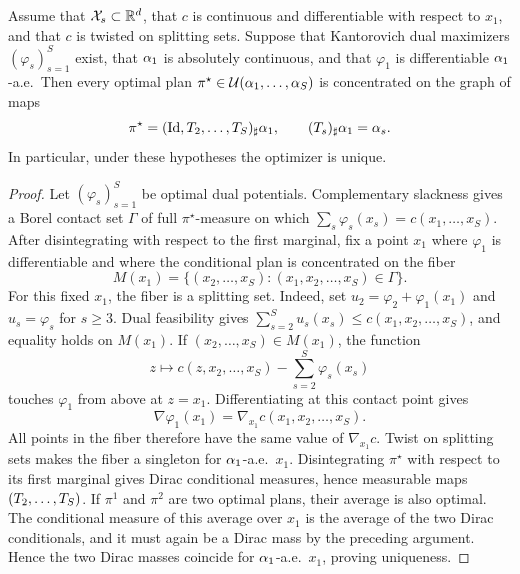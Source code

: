 \begin{prop}\label{prop-multimarginal-monge-structure}
	Assume that $\mathcal{X}_s\subset\mathbb{R}^d$, that $c$ is continuous and differentiable with respect to $x_1$, and that $c$ is twisted on splitting sets. Suppose that Kantorovich dual maximizers $(\varphi_s)_{s=1}^S$ exist, that $\alpha_1$ is absolutely continuous, and that $\varphi_1$ is differentiable $\alpha_1$-a.e.\ Then every optimal plan $\pi^\star\in\mathcal{U}(\alpha_1,\ldots,\alpha_S)$ is concentrated on the graph of maps
	\[
		\pi^\star=(\mathrm{Id},T_2,\ldots,T_S)_\sharp\alpha_1,
		\qquad
		(T_s)_\sharp\alpha_1=\alpha_s.
	\]
	In particular, under these hypotheses the optimizer is unique.
\end{prop}
\begin{proof}
	Let $(\varphi_s)_{s=1}^S$ be optimal dual potentials. Complementary slackness gives a Borel contact set $\Gamma$ of full $\pi^\star$-measure on which $\sum_s\varphi_s(x_s)=c(x_1,\ldots,x_S)$. After disintegrating with respect to the first marginal, fix a point $x_1$ where $\varphi_1$ is differentiable and where the conditional plan is concentrated on the fiber
	\[
		M(x_1)=\{(x_2,\ldots,x_S):(x_1,x_2,\ldots,x_S)\in\Gamma\}.
	\]
	For this fixed $x_1$, the fiber is a splitting set. Indeed, set $u_2=\varphi_2+\varphi_1(x_1)$ and $u_s=\varphi_s$ for $s\geq3$. Dual feasibility gives $\sum_{s=2}^S u_s(x_s)\leq c(x_1,x_2,\ldots,x_S)$, and equality holds on $M(x_1)$. If $(x_2,\ldots,x_S)\in M(x_1)$, the function
	\[
		z\longmapsto c(z,x_2,\ldots,x_S)-\sum_{s=2}^S\varphi_s(x_s)
	\]
	touches $\varphi_1$ from above at $z=x_1$. Differentiating at this contact point gives
	\[
		\nabla\varphi_1(x_1)=\nabla_{x_1}c(x_1,x_2,\ldots,x_S).
	\]
	All points in the fiber therefore have the same value of $\nabla_{x_1}c$. Twist on splitting sets makes the fiber a singleton for $\alpha_1$-a.e.\ $x_1$. Disintegrating $\pi^\star$ with respect to its first marginal gives Dirac conditional measures, hence measurable maps $(T_2,\ldots,T_S)$. If $\pi^1$ and $\pi^2$ are two optimal plans, their average is also optimal. The conditional measure of this average over $x_1$ is the average of the two Dirac conditionals, and it must again be a Dirac mass by the preceding argument. Hence the two Dirac masses coincide for $\alpha_1$-a.e.\ $x_1$, proving uniqueness.
\end{proof}


